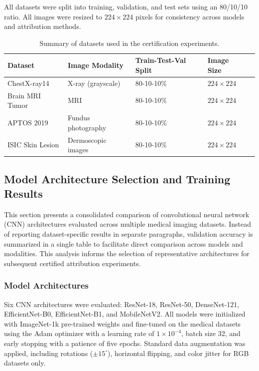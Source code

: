\documentclass[11pt]{article}
\begin{document}
All datasets were split into training, validation, and test sets using an 80/10/10 ratio. All images were resized to $224 \times 224$ pixels for consistency across models and attribution methods.

\begin{table}[h!]
\centering
\caption{Summary of datasets used in the certification experiments.}
\begin{tabularx}{\linewidth}{|X|X|X|X|X|}
\hline
\textbf{Dataset} & \textbf{Image Modality} & \textbf{Train-Test-Val Split} & \textbf{Image Size} \\
\hline
ChestX-ray14 & X-ray (grayscale) & 80-10-10\% & $224 \times 224$ \\
\hline
Brain MRI Tumor & MRI & 80-10-10\% & $224 \times 224$ \\
\hline
APTOS 2019 & Fundus photography& 80-10-10\% & $224 \times 224$ \\
\hline
ISIC Skin Lesion & Dermoscopic images & 80-10-10\% & $224 \times 224$ \\
\hline
\end{tabularx}
\label{tab:dataset_summary}
\end{table}


\subsection{Model Architecture Selection and Training Results}

This section presents a consolidated comparison of convolutional neural network (CNN) architectures evaluated across multiple medical imaging datasets. Instead of reporting dataset-specific results in separate paragraphs, validation accuracy is summarized in a single table to facilitate direct comparison across models and modalities. This analysis informs the selection of representative architectures for subsequent certified attribution experiments.

\subsubsection{Model Architectures}

Six CNN architectures were evaluated: ResNet-18, ResNet-50, DenseNet-121, EfficientNet-B0, EfficientNet-B1, and MobileNetV2. All models were initialized with ImageNet-1k pre-trained weights and fine-tuned on the medical datasets using the Adam optimizer with a learning rate of $1 \times 10^{-4}$, batch size 32, and early stopping with a patience of five epochs. Standard data augmentation was applied, including rotations ($\pm15^\circ$), horizontal flipping, and color jitter for RGB datasets only.
\end{document}
